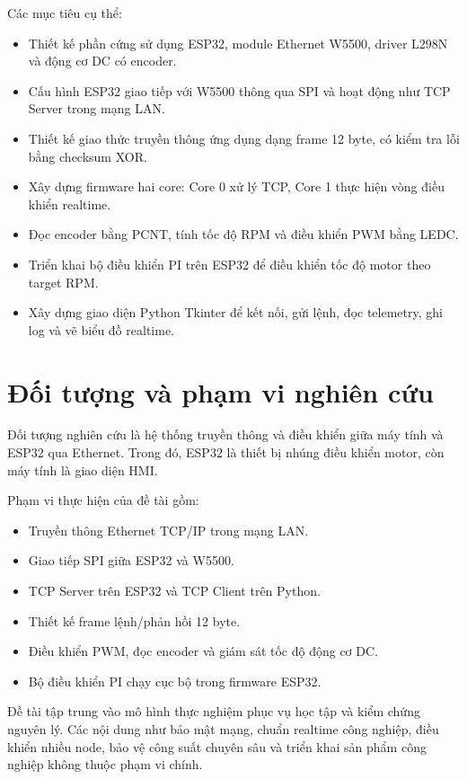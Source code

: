 \documentclass[12pt,a4paper]{report}
\begin{document}
Các mục tiêu cụ thể:
\begin{itemize}
    \item Thiết kế phần cứng sử dụng ESP32, module Ethernet W5500, driver L298N và động cơ DC có encoder.
    \item Cấu hình ESP32 giao tiếp với W5500 thông qua SPI và hoạt động như TCP Server trong mạng LAN.
    \item Thiết kế giao thức truyền thông ứng dụng dạng frame 12 byte, có kiểm tra lỗi bằng checksum XOR.
    \item Xây dựng firmware hai core: Core 0 xử lý TCP, Core 1 thực hiện vòng điều khiển realtime.
    \item Đọc encoder bằng PCNT, tính tốc độ RPM và điều khiển PWM bằng LEDC.
    \item Triển khai bộ điều khiển PI trên ESP32 để điều khiển tốc độ motor theo target RPM.
    \item Xây dựng giao diện Python Tkinter để kết nối, gửi lệnh, đọc telemetry, ghi log và vẽ biểu đồ realtime.
\end{itemize}

\section{Đối tượng và phạm vi nghiên cứu}

Đối tượng nghiên cứu là hệ thống truyền thông và điều khiển giữa máy tính và ESP32 qua Ethernet. Trong đó, ESP32 là thiết bị nhúng điều khiển motor, còn máy tính là giao diện HMI.

Phạm vi thực hiện của đề tài gồm:
\begin{itemize}
    \item Truyền thông Ethernet TCP/IP trong mạng LAN.
    \item Giao tiếp SPI giữa ESP32 và W5500.
    \item TCP Server trên ESP32 và TCP Client trên Python.
    \item Thiết kế frame lệnh/phản hồi 12 byte.
    \item Điều khiển PWM, đọc encoder và giám sát tốc độ động cơ DC.
    \item Bộ điều khiển PI chạy cục bộ trong firmware ESP32.
\end{itemize}

Đề tài tập trung vào mô hình thực nghiệm phục vụ học tập và kiểm chứng nguyên lý. Các nội dung như bảo mật mạng, chuẩn realtime công nghiệp, điều khiển nhiều node, bảo vệ công suất chuyên sâu và triển khai sản phẩm công nghiệp không thuộc phạm vi chính.
\end{document}
